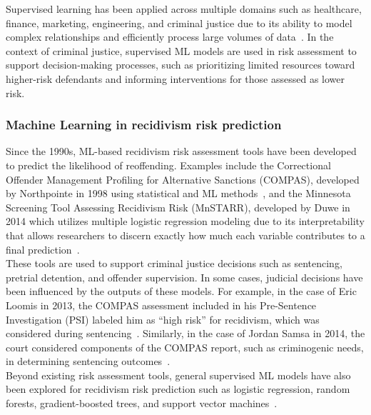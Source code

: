 \documentclass[12pt]{article}
\begin{document}
Supervised learning has been applied across multiple domains such as healthcare, finance, marketing, engineering, and criminal justice due to its ability to model complex relationships and efficiently process large volumes of data~\cite{duwe2017out,ozkan2017predicting}. In the context of criminal justice, supervised ML models are used in risk assessment to support decision-making processes, such as prioritizing limited resources toward higher-risk defendants and informing interventions for those assessed as lower risk. 

\subsubsection{Machine Learning in recidivism risk prediction}
\tab Since the 1990s, ML-based recidivism risk assessment tools have been developed to predict the likelihood of reoffending. Examples include the Correctional Offender Management Profiling for Alternative Sanctions (COMPAS), developed by Northpointe in 1998 using statistical and ML methods~\cite{northpointe2015practitioner}, and the Minnesota Screening Tool Assessing Recidivism Risk (MnSTARR), developed by Duwe in 2014 which utilizes multiple logistic regression modeling due to its interpretability that allows researchers to discern exactly how much each variable contributes to a final prediction~\cite{duwe2014development}.\\

These tools are used to support criminal justice decisions such as sentencing, pretrial detention, and offender supervision. In some cases, judicial decisions have been influenced by the outputs of these models. For example, in the case of Eric Loomis in 2013, the COMPAS assessment included in his Pre-Sentence Investigation (PSI) labeled him as “high risk” for recidivism, which was considered during sentencing~\cite{loomis2016}. Similarly, in the case of Jordan Samsa in 2014, the court considered components of the COMPAS report, such as criminogenic needs, in determining sentencing outcomes~\cite{samsa2014,liu2019beyond}.\\

Beyond existing risk assessment tools, general supervised ML models have also been explored for recidivism risk prediction such as logistic regression, random forests, gradient-boosted trees, and support vector machines~\cite{duwe2017out,ozkan2017predicting,ngo2018traditional}.
\end{document}
